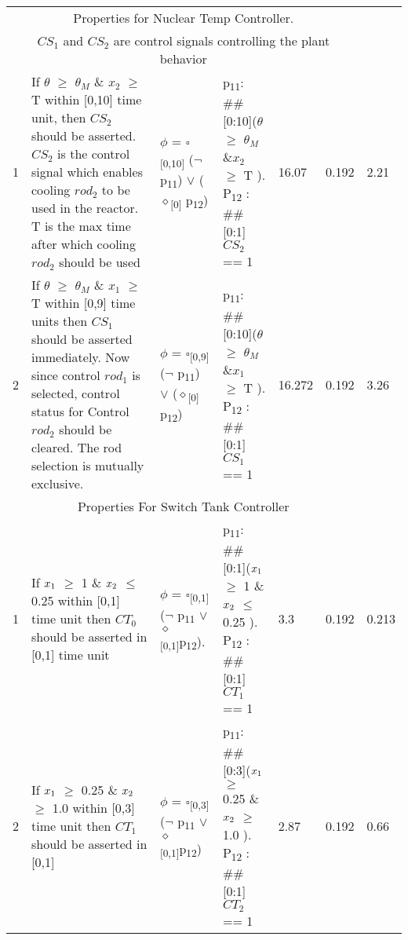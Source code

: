 {\begin{table}[]
{\begin{tabular}{ |p{0.3cm}|p{3.3cm}|p{3.3cm}|p{3 cm}|p{1.1cm}|p{0.5cm}|p{0.5cm}|}
		\multicolumn{6}{|c|}{Properties for Nuclear Temp Controller.} \\
		\multicolumn{6}{|c|}{$CS_{1}$ and $CS_{2}$ are control signals 
			controlling the plant behavior}\\
		\hline
		1 & If $\theta$	 $\geq$ 	$\theta_{M}$  \&  $\textit{x}_{2}$  $\geq$ T within [0,10] time unit,  then $CS_{2}$ should be asserted.$CS_{2}$ is the control signal which enables cooling $rod_{2}$ to be used in the reactor. T is the max time after which cooling $rod_{2}$ should be used & $\phi$ = $\square$\textsubscript{[0,10]} ($\neg$ p\textsubscript{11}) $\vee$ ($\diamond$\textsubscript{[0]} p\textsubscript{12}) &  p\textsubscript{11}: \#\#[0:10]($\theta$ $\geq$ $\theta_{M}$ \&$\textit{x}_{2}$  $\geq$ T ). P\textsubscript{12} : \#\#[0:1]$CS_{2}$ == 1&16.07 & 0.192 & 2.21 \\
		
		
		2 & If $\theta$	 $\geq$ $\theta_{M}$  \&  $\textit{x}_{1}$  $\geq$ T within [0,9] time units then $CS_{1}$ should be asserted immediately. Now since control $rod_{1}$ is selected, control status for Control $rod_{2}$ should be cleared. The rod selection is mutually exclusive.& $\phi$ = $\square$\textsubscript{[0,9]} ($\neg$ p\textsubscript{11}) $\vee$ ($\diamond$\textsubscript{[0]} p\textsubscript{12})	&  p\textsubscript{11}: \#\#[0:10]($\theta$ $\geq$ $\theta_{M}$ \&$\textit{x}_{1}$  $\geq$ T ). P\textsubscript{12} : \#\#[0:1]$CS_{1}$ == 1& 16.272 &0.192 & 3.26 \\
		\hline
		\multicolumn{6}{|c|}{Properties For Switch Tank  Controller}  \\
		\hline
		1 & If $x\textsubscript{1}$ $\geq$ 1 \& $x\textsubscript{2}$ $\leq$ 0.25 within [0,1] time unit then $CT_{0}$ should be asserted in [0,1] time unit  & $\phi$ = $\square$\textsubscript{[0,1]} ($\neg$ p\textsubscript{11} $\vee$ $\diamond$\textsubscript{[0,1]}p\textsubscript{12}).& p\textsubscript{11}: \#\#[0:1]($x\textsubscript{1}$ $\geq$ 1 \& $x\textsubscript{2}$ $\leq$ 0.25 ). P\textsubscript{12} : \#\#[0:1]$CT_{1}$ == 1 &3.3  & 0.192 & 0.213\\
		2 & If $x\textsubscript{1}$ $\geq$ 0.25 \& $x\textsubscript{2}$ $\geq$ 1.0 within [0,3] time unit then $CT_{1}$ should be asserted in [0,1]  & $\phi$ = $\square$\textsubscript{[0,3]} ($\neg$ p\textsubscript{11} $\vee$ $\diamond$\textsubscript{[0,1]}p\textsubscript{12})	&p\textsubscript{11}: \#\#[0:3]($x\textsubscript{1}$ $\geq$ 0.25 \& $x\textsubscript{2}$ $\geq$ 1.0 ). P\textsubscript{12} : \#\#[0:1]$CT_{2}$ == 1 &2.87 & 0.192 & 0.66 \\
		

\end{tabular}}
\end{table}}
